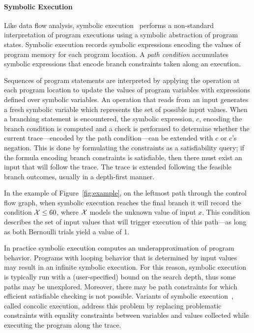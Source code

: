 \paragraph{Symbolic Execution}
Like data flow analysis, symbolic execution~\cite{king1976symbolic,clarke1976system} 
performs a non-standard interpretation of program executions using 
a symbolic abstraction of program states.
Symbolic execution records symbolic expressions encoding the
values of program memory for each program location.  
A \textit{path condition}
accumulates symbolic expressions that encode branch constraints 
taken along an execution.

Sequences of program statements are interpreted by applying the operation
at each program location to update the values of program
variables with expressions defined over symbolic variables.
An operation that reads from an input generates a fresh symbolic
variable which represents the set of possible input values.
When a branching statement is encountered, the symbolic expression, $c$, 
encoding the branch condition is computed and a check is performed
to determine whether the current trace---encoded by the path condition---can be
extended with $c$ or $c$'s negation.  
This is done by formulating the constraints
as a satisfiability query; if the formula encoding branch constraints
is satisfiable, then there must exist an input that will follow the trace.
The trace is extended following the feasible branch outcomes, usually
in a depth-first manner.

In the example of Figure~\ref{fig:example}, on the leftmost path through
the control flow graph, when symbolic execution reaches the 
final branch it will record the condition ${\cal X} \le 60$, where
${\cal X}$ models the unknown value of input $x$.  This condition describes the
set of input values that will trigger execution of this path---as long
as both Bernoulli trials yield a value of 1.

In practice symbolic execution computes an underapproximation of 
program behavior.
Programs with looping behavior that is determined by input values 
may result in an infinite symbolic execution.
For this reason, symbolic execution is
typically run with a (user-specified) bound on the search depth, thus
some paths may be unexplored.   Moreover, there may be path constraints
for which efficient satisfiable checking is not possible.  Variants of
symbolic execution~\cite{godefroid2005dart,sen2005cute,song2008bitblaze},
called concolic execution, address this problem by replacing problematic 
constraints with equality constraints between variables 
and values collected while executing the program along the trace.

